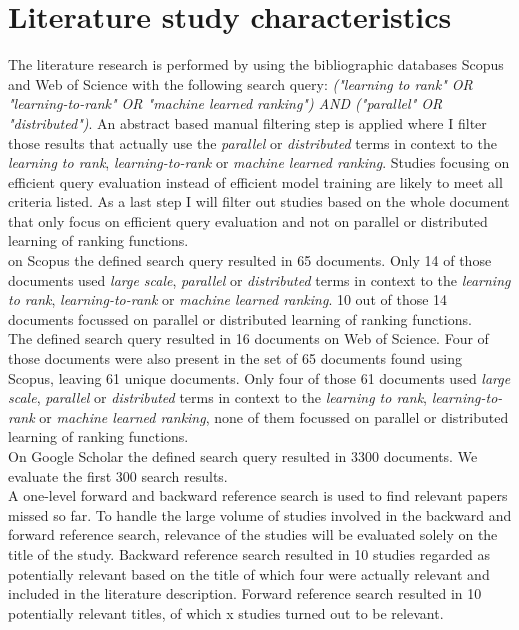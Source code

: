 \section{Literature study characteristics}
The literature research is performed by using the bibliographic databases Scopus and Web of Science with the following search query: \emph{("learning to rank" OR "learning-to-rank" OR "machine learned ranking") AND ("parallel" OR "distributed")}. An abstract based manual filtering step is applied where I filter those results that actually use the \emph{parallel} or \emph{distributed} terms in context to the \emph{learning to rank}, \emph{learning-to-rank} or \emph{machine learned ranking}. Studies focusing on efficient query evaluation instead of efficient model training are likely to meet all criteria listed. As a last step I will filter out studies based on the whole document that only focus on efficient query evaluation and not on parallel or distributed learning of ranking functions.\\

on Scopus the defined search query resulted in 65 documents. Only 14 of those documents used \emph{large scale}, \emph{parallel} or \emph{distributed} terms in context to the \emph{learning to rank}, \emph{learning-to-rank} or \emph{machine learned ranking}. 10 out of those 14 documents focussed on parallel or distributed learning of ranking functions.\\

The defined search query resulted in 16 documents on Web of Science. Four of those documents were also present in the set of 65 documents found using Scopus, leaving 61 unique documents. Only four of those 61 documents used \emph{large scale}, \emph{parallel} or \emph{distributed} terms in context to the \emph{learning to rank}, \emph{learning-to-rank} or \emph{machine learned ranking}, none of them focussed on parallel or distributed learning of ranking functions.\\

On Google Scholar the defined search query resulted in 3300 documents. We evaluate the first 300 search results.\\

A one-level forward and backward reference search is used to find relevant papers missed so far. To handle the large volume of studies involved in the backward and forward reference search, relevance of the studies will be evaluated solely on the title of the study. Backward reference search resulted in 10 studies regarded as potentially relevant based on the title of which four were actually relevant and included in the literature description. Forward reference search resulted in 10 potentially relevant titles, of which x studies turned out to be relevant.\\

